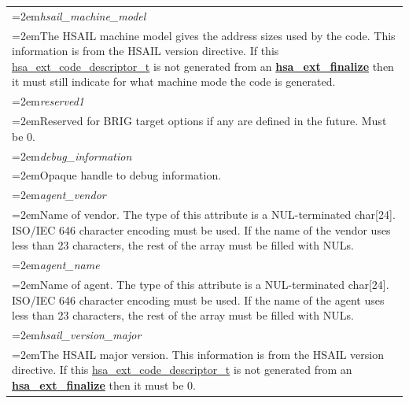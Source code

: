 \documentclass[final,oneside]{book}
\newcommand{\reffun}[1]{\textbf{#1}}
\newcommand{\reffld}[1]{\textit{#1}}
\begin{document}
\begin{longtable}{@{}>{\hangindent=2em}p{\textwidth}}
\hypertarget{hsa_\-ext_\-code_\-descriptor_\-t.hsail_\-machine_\-model}{\reffld{hsail_\-machine_\-model}}\\\hspace{2em}The HSAIL machine model gives the address sizes used by the code. This information is from the HSAIL version directive. If this \hyperlink{group__ext-finalizer_1ga0e01eabc57d7105ea37e1abbb50fa337}{hsa_\-ext_\-code_\-descriptor_\-t} is not generated from an \hyperlink{group__ext-finalizer_1ga1e316cdba4ac2ce42f17866aa2e9250d}{\reffun{hsa_\-ext_\-finalize}} then it must still indicate for what machine mode the code is generated.\\[2mm]
\hypertarget{hsa_\-ext_\-code_\-descriptor_\-t.reserved1}{\reffld{reserved1}}\\\hspace{2em}Reserved for BRIG target options if any are defined in the future. Must be 0.\\[2mm]
\hypertarget{hsa_\-ext_\-code_\-descriptor_\-t.debug_\-information}{\reffld{debug_\-information}}\\\hspace{2em}Opaque handle to debug information.\\[2mm]
\hypertarget{hsa_\-ext_\-code_\-descriptor_\-t.agent_\-vendor}{\reffld{agent_\-vendor}}\\\hspace{2em}Name of vendor. The type of this attribute is a NUL-terminated char[24]. ISO/IEC 646 character encoding must be used. If the name of the vendor uses less than 23 characters, the rest of the array must be filled with NULs.\\[2mm]
\hypertarget{hsa_\-ext_\-code_\-descriptor_\-t.agent_\-name}{\reffld{agent_\-name}}\\\hspace{2em}Name of agent. The type of this attribute is a NUL-terminated char[24]. ISO/IEC 646 character encoding must be used. If the name of the agent uses less than 23 characters, the rest of the array must be filled with NULs.\\[2mm]
\hypertarget{hsa_\-ext_\-code_\-descriptor_\-t.hsail_\-version_\-major}{\reffld{hsail_\-version_\-major}}\\\hspace{2em}The HSAIL major version. This information is from the HSAIL version directive. If this \hyperlink{group__ext-finalizer_1ga0e01eabc57d7105ea37e1abbb50fa337}{hsa_\-ext_\-code_\-descriptor_\-t} is not generated from an \hyperlink{group__ext-finalizer_1ga1e316cdba4ac2ce42f17866aa2e9250d}{\reffun{hsa_\-ext_\-finalize}} then it must be 0.\\[2mm]

\end{longtable}
\end{document}
